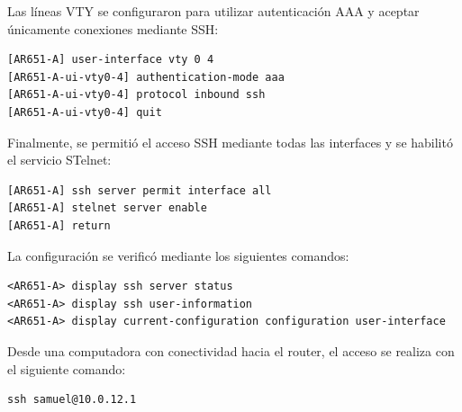 Las líneas VTY se configuraron para utilizar autenticación AAA y aceptar
únicamente conexiones mediante SSH:

\begin{lstlisting}[style=terminal]
[AR651-A] user-interface vty 0 4
[AR651-A-ui-vty0-4] authentication-mode aaa
[AR651-A-ui-vty0-4] protocol inbound ssh
[AR651-A-ui-vty0-4] quit
\end{lstlisting}

Finalmente, se permitió el acceso SSH mediante todas las interfaces y se
habilitó el servicio STelnet:

\begin{lstlisting}[style=terminal]
[AR651-A] ssh server permit interface all
[AR651-A] stelnet server enable
[AR651-A] return
\end{lstlisting}

La configuración se verificó mediante los siguientes comandos:

\begin{lstlisting}[style=terminal]
<AR651-A> display ssh server status
<AR651-A> display ssh user-information
<AR651-A> display current-configuration configuration user-interface
\end{lstlisting}

Desde una computadora con conectividad hacia el router, el acceso se realiza
con el siguiente comando:

\begin{lstlisting}[style=terminal]
ssh samuel@10.0.12.1
\end{lstlisting}